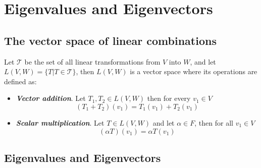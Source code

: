 \documentclass{report}
\begin{document}
    \tableofcontents

    \pagebreak
    \chapter{ Eigenvalues and Eigenvectors }

    \section{The vector space of linear combinations}

    Let $\mathcal{T}$ be the set of all linear transformations from $V$ into $W$, and let $L(V,W) = \{T| T \in \mathcal{T}\}$, then $L(V,W)$ is a vector space where its operations are defined as:

    \begin{itemize}
        \item \textit{\textbf{Vector addition}}. Let $T_1, T_2 \in L(V,W)$ then for every $v_1 \in V$
        $$(T_1+T_2)(v_1) = T_1(v_1) + T_2(v_1)$$
        \item \textit{\textbf{Scalar multiplication}}. Let $T \in L(V,W)$ and let $\alpha \in F$, then for all $v_1 \in V$
        $$(\alpha T)(v_1) = \alpha T(v_1)$$
    \end{itemize}

    \section{Eigenvalues and Eigenvectors}
\end{document}
